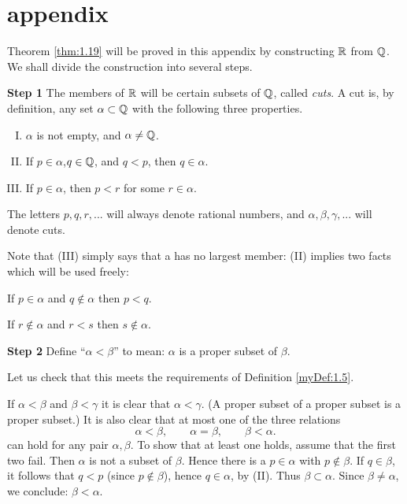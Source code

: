\section*{appendix}
Theorem \ref{thm:1.19} will be proved in this appendix 
by constructing ${\protect\mathbb R}$ from ${\protect\mathbb Q}$. 
We shall divide the construction into several steps.

\textbf{Step 1} 
The members of ${\protect\mathbb R}$ will be certain subsets of ${\protect\mathbb Q}$, called \emph{cuts}. 
A cut is, by definition, 
any set $\alpha \subset {\protect\mathbb Q}$ with the following three properties.
\begin{enumerate}[(I)]
    \item $\alpha$ is not empty, and $\alpha \neq {\protect\mathbb Q}$.
    \item If $p\in \alpha$,$q \in {\protect\mathbb Q}$, and $q <p$, then $q \in \alpha$.
    \item If $p \in \alpha$, then $p <r$ for some $r\in \alpha$.
\end{enumerate}

The letters $p, q, r, ...$ will always denote rational numbers, 
and $\alpha, \beta, \gamma, ...$ will denote cuts.

Note that (III) simply says that a has no largest member: 
(II) implies two facts which will be used freely:

If $p\in\alpha$ and $q\not\in\alpha$ then $p<q$.

If $r\not\in \alpha$ and $r<s$ then $s\not\in \alpha$.

\textbf{Step 2}
Define ``$\alpha < \beta$'' to mean: 
$\alpha$ is a proper subset of $\beta$.

Let us check that this meets the requirements of Definition \ref{myDef:1.5}.

If $\alpha < \beta$ and $\beta < \gamma$ it is clear that $\alpha < \gamma$. 
(A proper subset of a proper subset is a proper subset.) 
It is also clear that at most one of the three relations
\begin{equation*}
    \alpha < \beta, \qquad
    \alpha = \beta, \qquad
    \beta < \alpha.
\end{equation*}
can hold for any pair $\alpha, \beta$. 
To show that at least one holds, assume that the first two fail. 
Then $\alpha$ is not a subset of $\beta$. 
Hence there is a $p \in \alpha$ with $p \not\in \beta$. 
If $q \in \beta$, it follows that $q <p$ (since $p \not\in \beta$), 
hence $q \in \alpha$, by (II). 
Thus $\beta \subset \alpha$. 
Since $\beta \neq \alpha$, we conclude: $\beta < \alpha$.


